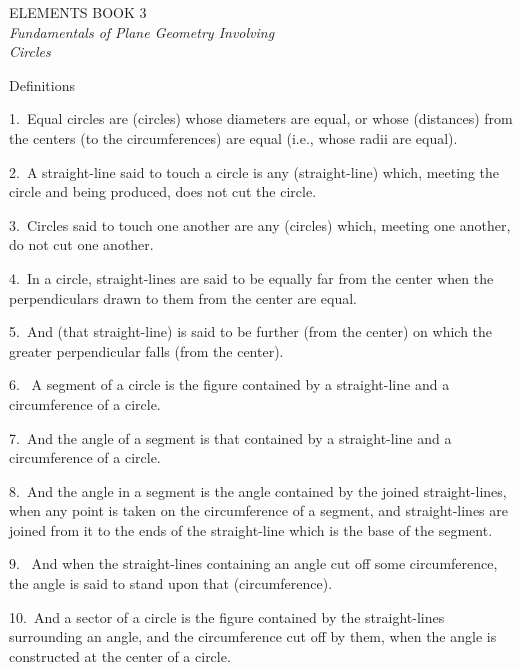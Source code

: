 \pagestyle{plain}
\begin{center}
{\Huge ELEMENTS BOOK 3}\\
\spa\spa\spa
{\huge\it Fundamentals of Plane Geometry Involving}\\[0.5ex] {\huge\it Circles}
\end{center}\newpage

\pagestyle{fancy}
\cfoot{\gr{\thepage}}

\begin{center}
{\large Definitions}
\end{center}

1.~Equal circles are (circles) whose diameters are equal,  or whose (distances)
from the centers (to the circumferences) are equal (i.e., whose radii are equal).

2.~A straight-line said to touch a circle  is any (straight-line) which, meeting the circle and being produced, does not cut the circle.

3.~Circles said to touch one another are any (circles) which, meeting one another, do not cut one another.

4.~In a circle, straight-lines are said to be equally far from the center
when the perpendiculars drawn to them from the center are equal.

5.~And (that straight-line) is said to be further (from the center) on
which the greater perpendicular falls (from the center).

6. ~A segment of a circle is the figure contained by a straight-line
and a circumference of a circle.

7.~And the angle of a segment is that contained by a straight-line
and a circumference of a circle.

8.~And the angle in a segment is the
angle contained by the joined straight-lines, when any
point  is taken on the circumference of a segment, 
and straight-lines are joined from it to the ends of the straight-line which is the base of the
segment.

9. ~And when the straight-lines containing an angle cut off some circumference, the angle is said to stand upon that (circumference).

10.~And a sector of a circle is the figure contained by the
straight-lines surrounding an angle, and the circumference cut off by them,
when the angle is constructed at the center of a circle.

